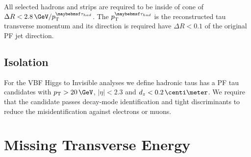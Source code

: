 All selected hadrons and strips are required to be inside of cone of $\Delta R < 2.8\,\GeV/\pt^{\tau_{had}}$. The $\pt^{\tau_{had}}$ is the reconstructed tau transverse momentum and its direction is required have $\Delta R < 0.1$ of the original \gls{PF} jet direction.

\subsection{Isolation}
\label{SECTION:EventReconstructionPhysicsObjects_Taus_Isolation}




For the \gls{VBF} Higgs to Invisible analyses we define hadronic taus has a \gls{PF} tau candidates with $\pt > 20 \,\GeV$, $|\eta|<2.3$ and $d_z<0.2 \,\centi\meter$. We require that the candidate passes decay-mode identification and tight discriminants to reduce the misidentification against electrons or muons. 

% 

\section{Missing Transverse Energy}
\label{SECTION:EventReconstructionPhysicsObjects_MET}

